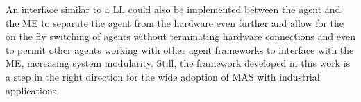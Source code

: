 An interface similar to a \acrlong{LL} could also be implemented between the agent and the \acrlong{ME} to separate the agent from the hardware even further and allow for the on the fly switching of agents without terminating hardware connections and even to permit other agents working with other agent frameworks to interface with the \acrlong{ME}, increasing system modularity. Still, the framework developed in this work is a step in the right direction for the wide adoption of \acrlong{MAS} with industrial applications.
